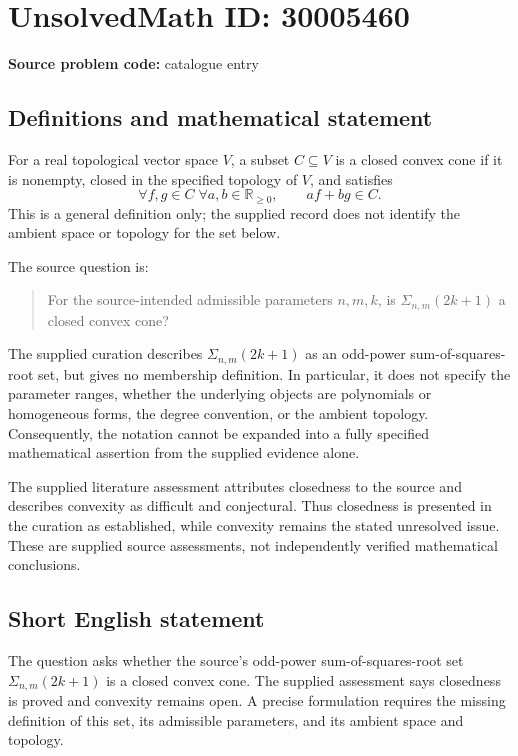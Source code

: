 \documentclass[11pt]{article}
\newcommand{\R}{\mathbb{R}}
\begin{document}
\section*{UnsolvedMath ID: 30005460}
\textbf{Source problem code:} catalogue entry
\subsection{Definitions and mathematical statement}
For a real topological vector space \(V\), a subset \(C\subseteq V\) is a closed convex cone if it is nonempty, closed in the specified topology of \(V\), and satisfies
\[
\forall f,g\in C\;\forall a,b\in\R_{\geq 0},\qquad af+bg\in C.
\]
This is a general definition only; the supplied record does not identify the ambient space or topology for the set below.

The source question is:
\begin{quote}
For the source-intended admissible parameters \(n,m,k\), is \(\Sigma_{n,m}(2k+1)\) a closed convex cone?
\end{quote}
The supplied curation describes \(\Sigma_{n,m}(2k+1)\) as an odd-power sum-of-squares-root set, but gives no membership definition. In particular, it does not specify the parameter ranges, whether the underlying objects are polynomials or homogeneous forms, the degree convention, or the ambient topology. Consequently, the notation cannot be expanded into a fully specified mathematical assertion from the supplied evidence alone.

The supplied literature assessment attributes closedness to the source and describes convexity as difficult and conjectural. Thus closedness is presented in the curation as established, while convexity remains the stated unresolved issue. These are supplied source assessments, not independently verified mathematical conclusions.
\subsection{Short English statement}
The question asks whether the source's odd-power sum-of-squares-root set \(\Sigma_{n,m}(2k+1)\) is a closed convex cone. The supplied assessment says closedness is proved and convexity remains open. A precise formulation requires the missing definition of this set, its admissible parameters, and its ambient space and topology.
\end{document}
